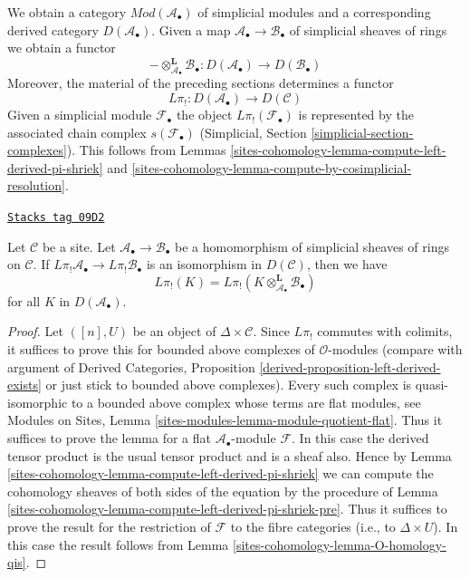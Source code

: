 We obtain a category $\textit{Mod}(\mathcal{A}_\bullet)$ of
simplicial modules and a corresponding derived category
$D(\mathcal{A}_\bullet)$. Given a map
$\mathcal{A}_\bullet \to \mathcal{B}_\bullet$ of simplicial sheaves
of rings we obtain a functor
$$
- \otimes^\mathbf{L}_{\mathcal{A}_\bullet} \mathcal{B}_\bullet :
D(\mathcal{A}_\bullet)
\longrightarrow
D(\mathcal{B}_\bullet)
$$
Moreover, the material of the preceding sections determines a functor
$$
L\pi_! : D(\mathcal{A}_\bullet) \longrightarrow D(\mathcal{C})
$$
Given a simplicial module $\mathcal{F}_\bullet$ the object
$L\pi_!(\mathcal{F}_\bullet)$ is represented by the associated
chain complex $s(\mathcal{F}_\bullet)$
(Simplicial, Section \ref{simplicial-section-complexes}).
This follows from
Lemmas \ref{sites-cohomology-lemma-compute-left-derived-pi-shriek} and
\ref{sites-cohomology-lemma-compute-by-cosimplicial-resolution}.

\begin{lemma}
\label{sites-cohomology-lemma-base-change-by-qis}
\href{https://stacks.math.columbia.edu/tag/09D2}{\texttt{Stacks tag 09D2}}

Let $\mathcal{C}$ be a site. Let $\mathcal{A}_\bullet \to \mathcal{B}_\bullet$
be a homomorphism of simplicial sheaves of rings on $\mathcal{C}$.
If $L\pi_!\mathcal{A}_\bullet \to L\pi_!\mathcal{B}_\bullet$ is an
isomorphism in $D(\mathcal{C})$, then we have
$$
L\pi_!(K) =
L\pi_!(K \otimes^\mathbf{L}_{\mathcal{A}_\bullet} \mathcal{B}_\bullet)
$$
for all $K$ in $D(\mathcal{A}_\bullet)$.
\end{lemma}

\begin{proof}
Let $([n], U)$ be an object of $\Delta \times \mathcal{C}$. Since $L\pi_!$
commutes with colimits, it suffices to prove this for bounded above complexes
of $\mathcal{O}$-modules (compare with argument of
Derived Categories, Proposition \ref{derived-proposition-left-derived-exists}
or just stick to bounded above complexes). Every such complex is
quasi-isomorphic to a bounded above complex whose terms are flat modules, see
Modules on Sites, Lemma \ref{sites-modules-lemma-module-quotient-flat}.
Thus it suffices to prove the lemma for a flat $\mathcal{A}_\bullet$-module
$\mathcal{F}$. In this case the derived tensor product is the usual
tensor product and is a sheaf also. Hence by
Lemma \ref{sites-cohomology-lemma-compute-left-derived-pi-shriek}
we can compute the cohomology
sheaves of both sides of the equation by the procedure of
Lemma \ref{sites-cohomology-lemma-compute-left-derived-pi-shriek-pre}.
Thus it suffices to prove the result for the restriction of
$\mathcal{F}$ to the fibre categories (i.e., to $\Delta \times U$).
In this case the result follows from Lemma \ref{sites-cohomology-lemma-O-homology-qis}.
\end{proof}

